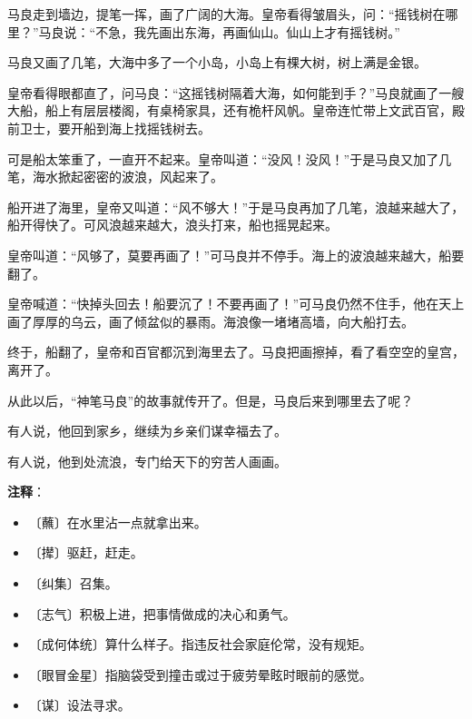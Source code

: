 \documentclass[12pt,UTF-8,openany]{ctexbook}
\begin{document}
\begin{Large}
    马良走到墙边，提笔一挥，画了广阔的大海。皇帝看得皱眉头，问：“摇钱树在哪里？”马良说：“不急，我先画出东海，再画仙山。仙山上才有摇钱树。”
    
    马良又画了几笔，大海中多了一个小岛，小岛上有棵大树，树上满是金银。
    
    皇帝看得眼都直了，问马良：“这摇钱树隔着大海，如何能到手？”马良就画了一艘大船，船上有层层楼阁，有桌椅家具，还有桅杆风帆。皇帝连忙带上文武百官，殿前卫士，要开船到海上找摇钱树去。
    
    可是船太笨重了，一直开不起来。皇帝叫道：“没风！没风！”于是马良又加了几笔，海水掀起密密的波浪，风起来了。
    
    船开进了海里，皇帝又叫道：“风不够大！”于是马良再加了几笔，浪越来越大了，船开得快了。可风浪越来越大，浪头打来，船也摇晃起来。
    
    皇帝叫道：“风够了，莫要再画了！”可马良并不停手。海上的波浪越来越大，船要翻了。
    
    皇帝喊道：“快掉头回去！船要沉了！不要再画了！”可马良仍然不住手，他在天上画了厚厚的乌云，画了倾盆似的暴雨。海浪像一堵堵高墙，向大船打去。
    
    终于，船翻了，皇帝和百官都沉到海里去了。马良把画擦掉，看了看空空的皇宫，离开了。
    
    从此以后，“神笔马良”的故事就传开了。但是，马良后来到哪里去了呢？
    
    有人说，他回到家乡，继续为乡亲们谋幸福去了。
    
    有人说，他到处流浪，专门给天下的穷苦人画画。
    
\end{Large}


\newpage

\textbf{注释}：

\vspace{-1em}

\begin{itemize}
    \setlength\itemsep{-0.2em}
    \item 〔蘸〕在水里沾一点就拿出来。
    \item 〔撵〕驱赶，赶走。
    \item 〔纠集〕召集。
    \item 〔志气〕积极上进，把事情做成的决心和勇气。
    \item 〔成何体统〕算什么样子。指违反社会家庭伦常，没有规矩。
    \item 〔眼冒金星〕指脑袋受到撞击或过于疲劳晕眩时眼前的感觉。
    \item 〔谋〕设法寻求。
\end{itemize}
\end{document}
